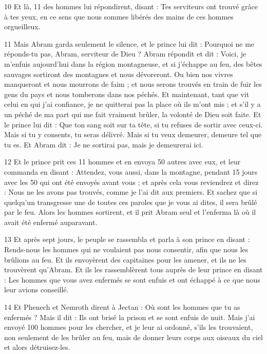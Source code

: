 \par 10 Et là, 11 des hommes lui répondirent, disant : Tes serviteurs ont trouvé grâce à tes yeux, en ce sens que nous sommes libérés des mains de ces hommes orgueilleux.

\par 11 Mais Abram garda seulement le silence, et le prince lui dit : Pourquoi ne me réponds-tu pas, Abram, serviteur de Dieu ? Abram répondit et dit : Voici, je m'enfuis aujourd'hui dans la région montagneuse, et si j'échappe au feu, des bêtes sauvages sortiront des montagnes et nous dévoreront. Ou bien nos vivres manqueront et nous mourrons de faim ; et nous serons trouvés en train de fuir les gens du pays et nous tomberons dans nos péchés. Et maintenant, tant que vit celui en qui j'ai confiance, je ne quitterai pas la place où ils m'ont mis ; et s'il y a un péché de ma part qui me fait vraiment brûler, la volonté de Dieu soit faite. Et le prince lui dit : Que ton sang soit sur ta tête, si tu refuses de sortir avec ceux-ci. Mais si tu y consents, tu seras délivré. Mais si tu veux demeurer, demeure tel que tu es. Et Abram dit : Je ne sortirai pas, mais je demeurerai ici.

\par 12 Et le prince prit ces 11 hommes et en envoya 50 autres avec eux, et leur commanda en disant : Attendez, vous aussi, dans la montagne, pendant 15 jours avec les 50 qui ont été envoyés avant vous ; et après cela vous reviendrez et direz : Nous ne les avons pas trouvés, comme je l'ai dit aux premiers. Et sachez que si quelqu’un transgresse une de toutes ces paroles que je vous ai dites, il sera brûlé par le feu. Alors les hommes sortirent, et il prit Abram seul et l'enferma là où il avait été enfermé auparavant.

\par 13 Et après sept jours, le peuple se rassembla et parla à son prince en disant : Rends-nous les hommes qui ne voulaient pas nous consentir, afin que nous les brûlions au feu. Et ils envoyèrent des capitaines pour les amener, et ils ne les trouvèrent qu'Abram. Et ils les rassemblèrent tous auprès de leur prince en disant : Les hommes que vous avez enfermés se sont enfuis et ont échappé à ce que nous leur avions conseillé.

\par 14 Et Phenech et Nemroth dirent à Jectan : Où sont les hommes que tu as enfermés ? Mais il dit : Ils ont brisé la prison et se sont enfuis de nuit. Mais j'ai envoyé 100 hommes pour les chercher, et je leur ai ordonné, s'ils les trouvaient, non seulement de les brûler au feu, mais de donner leurs corps aux oiseaux du ciel et alors détruisez-les.

